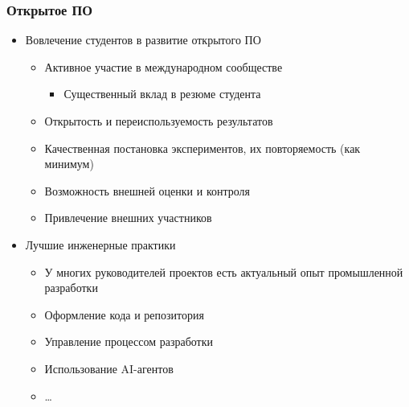 \documentclass[xcolor=table,aspectratio=169]{beamer}
\begin{document}
\begin{frame}[fragile]
  \frametitle{Открытое ПО}
  \begin{itemize}
      \item Вовлечение студентов в развитие открытого ПО 
      \begin{itemize}
        \item Активное участие в международном сообществе
        \begin{itemize}
        \item Существенный вклад в резюме студента
        \end{itemize}
        \item Открытость и переиспользуемость результатов
        \item Качественная постановка экспериментов, их повторяемость (как минимум)
        \item Возможность внешней оценки и контроля
        \item Привлечение внешних участников
      \end{itemize}
      \item Лучшие инженерные практики
      \begin{itemize}
        \item У многих руководителей проектов есть актуальный опыт промышленной разработки
        \item Оформление кода и репозитория
        \item Управление процессом разработки
        \item Использование AI-агентов
        \item \ldots
      \end{itemize}
      
  \end{itemize}
\end{frame}
\end{document}
